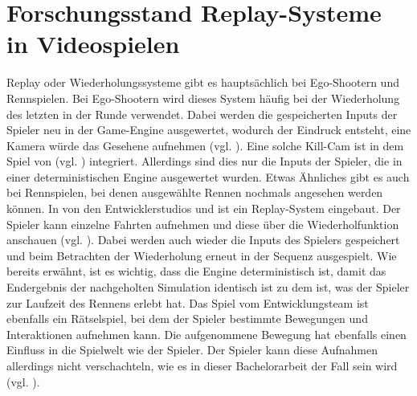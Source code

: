 \section{Forschungsstand Replay-Systeme in Videospielen}
Replay oder Wiederholungssysteme gibt es hauptsächlich bei Ego-Shootern und Rennspielen. Bei Ego-Shootern wird dieses System häufig bei der Wiederholung des letzten  in der Runde verwendet. Dabei werden die gespeicherten Inputs der Spieler neu in der Game-Engine ausgewertet, wodurch der Eindruck entsteht, eine Kamera würde das Gesehene aufnehmen (vgl. \cite{noauthor_new_nodate}). Eine solche Kill-Cam ist in dem Spiel  von  (vgl. \cite{noauthor_call_nodate}) integriert. Allerdings sind dies nur die Inputs der Spieler, die in einer deterministischen Engine ausgewertet wurden. Etwas Ähnliches gibt es auch bei Rennspielen, bei denen ausgewählte Rennen nochmals angesehen werden können. In  von den Entwicklerstudios  und  ist ein Replay-System eingebaut. Der Spieler kann einzelne Fahrten aufnehmen und diese über die Wiederholfunktion anschauen (vgl. \cite{noauthor_forza_nodate}). Dabei werden auch wieder die Inputs des Spielers gespeichert und beim Betrachten der Wiederholung erneut in der Sequenz ausgespielt. Wie bereits erwähnt, ist es wichtig, dass die Engine deterministisch ist, damit das Endergebnis der nachgeholten Simulation identisch ist zu dem ist, was der Spieler zur Laufzeit des Rennens erlebt hat. 
Das Spiel  vom Entwicklungsteam  ist ebenfalls ein Rätselspiel, bei dem der Spieler bestimmte Bewegungen und Interaktionen aufnehmen kann. Die aufgenommene Bewegung hat ebenfalls einen Einfluss in die Spielwelt wie der Spieler. Der Spieler kann diese Aufnahmen allerdings nicht verschachteln, wie es in dieser Bachelorarbeit der Fall sein wird (vgl. \cite{croteam_talos_2014}).

